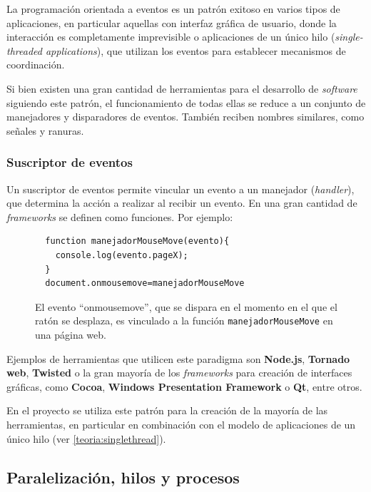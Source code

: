 La programación orientada a eventos es un patrón exitoso en varios tipos de aplicaciones, en particular aquellas con interfaz gráfica de usuario, donde la interacción es completamente imprevisible o aplicaciones de un único hilo (\textit{single-threaded applications}), que utilizan los eventos para establecer mecanismos de coordinación. 

Si bien existen una gran cantidad de herramientas para el desarrollo de \textit{software} siguiendo este patrón, el funcionamiento de todas ellas se reduce a un conjunto de manejadores y disparadores de eventos. También reciben nombres similares, como señales y ranuras.

\subsubsection{Suscriptor de eventos}

Un suscriptor de eventos permite vincular un evento a un manejador (\textit{handler}), que determina la acción a realizar al recibir un evento. En una gran cantidad de \textit{frameworks} se definen como funciones. Por ejemplo:

\begin{figure}[H]
\centering
  \begin{lstlisting}
  function manejadorMouseMove(evento){
    console.log(evento.pageX);
  }
  document.onmousemove=manejadorMouseMove
  \end{lstlisting}
\caption[Evento y manejador]{El evento ``onmousemove'', que se dispara en el momento en el que el ratón se desplaza, es vinculado a la función \texttt{manejadorMouseMove} en una página web.}
\end{figure}


Ejemplos de herramientas que utilicen este paradigma son \textbf{Node.js}, \textbf{Tornado web}, \textbf{Twisted} o la gran mayoría de los \textit{frameworks} para creación de interfaces gráficas, como \textbf{Cocoa}, \textbf{Windows Presentation Framework} o \textbf{Qt}, entre otros.

En el proyecto se utiliza este patrón para la creación de la mayoría de las herramientas, en particular en combinación con el modelo de aplicaciones de un único hilo (ver \ref{teoria:singlethread}).

\subsection{Paralelización, hilos y procesos}

